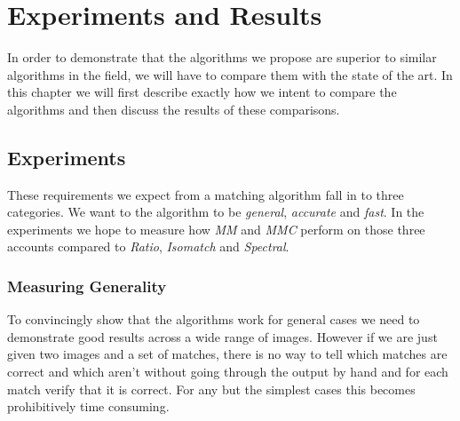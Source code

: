 \chapter{Experiments and Results}
\label{C:Experiments}

In order to demonstrate that the algorithms we propose are superior to 
similar algorithms in the field, we will have to compare them with the 
state of the art. In this chapter we will first describe exactly how we 
intent to compare the algorithms and then discuss the results of these 
comparisons.  

\section{Experiments}
These requirements we expect from a matching algorithm fall in to three 
categories.  We want to the algorithm to be \emph{general}, 
\emph{accurate} and \emph{fast}. In the experiments we hope to measure 
how \emph{MM} and \emph{MMC} perform on those three accounts compared to
\emph{Ratio}, \emph{Isomatch} and \emph{Spectral}.

\subsection{Measuring Generality}

To convincingly show that the algorithms work for general cases we need 
to demonstrate good results across a wide range of images.  However if 
we are just given two images and a set of matches, there is no
way to tell which matches are correct and which aren't without going 
through the output by hand and for each match verify that it is correct.  
For any but the simplest cases this becomes prohibitively time 
consuming.

